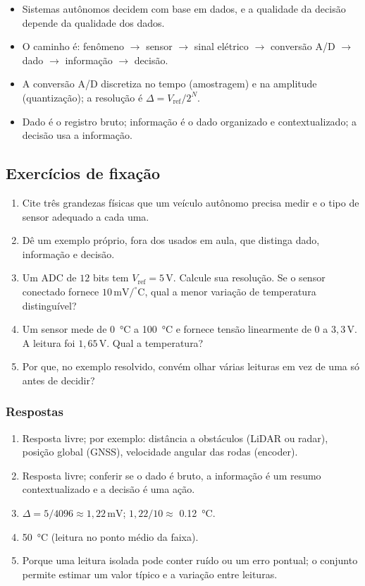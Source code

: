 \begin{itemize}
  \item Sistemas autônomos decidem com base em dados, e a qualidade da decisão depende da qualidade dos dados.
  \item O caminho é: fenômeno $\rightarrow$ sensor $\rightarrow$ sinal elétrico $\rightarrow$ conversão A/D $\rightarrow$ dado $\rightarrow$ informação $\rightarrow$ decisão.
  \item A conversão A/D discretiza no tempo (amostragem) e na amplitude (quantização); a resolução é $\Delta = V_{\mathrm{ref}}/2^{N}$.
  \item Dado é o registro bruto; informação é o dado organizado e contextualizado; a decisão usa a informação.
\end{itemize}
 
\subsection{Exercícios de fixação}
 
\begin{enumerate}
  \item Cite três grandezas físicas que um veículo autônomo precisa medir e o tipo de sensor adequado a cada uma.
  \item Dê um exemplo próprio, fora dos usados em aula, que distinga dado, informação e decisão.
  \item Um ADC de $12$ bits tem $V_{\mathrm{ref}} = 5\,\mathrm{V}$. Calcule sua resolução. Se o sensor conectado fornece $10\,\mathrm{mV}/^{\circ}\mathrm{C}$, qual a menor variação de temperatura distinguível?
	\item Um sensor mede de \qty{0}{\degreeCelsius} a \qty{100}{\degreeCelsius} e fornece tensão linearmente de $0$ a $3{,}3\,\mathrm{V}$. A leitura foi $1{,}65\,\mathrm{V}$. Qual a temperatura?
  \item Por que, no exemplo resolvido, convém olhar várias leituras em vez de uma só antes de decidir?
\end{enumerate}
 
\subsubsection*{Respostas}
 
\begin{enumerate}
  \item Resposta livre; por exemplo: distância a obstáculos (LiDAR ou radar), posição global (GNSS), velocidade angular das rodas (encoder).
  \item Resposta livre; conferir se o dado é bruto, a informação é um resumo contextualizado e a decisão é uma ação.
	\item $\Delta = 5/4096 \approx 1{,}22\,\mathrm{mV}$; $1{,}22/10 \approx$ \qty{0.12}{\degreeCelsius}.
	\item \qty{50}{\degreeCelsius} (leitura no ponto médio da faixa).
  \item Porque uma leitura isolada pode conter ruído ou um erro pontual; o conjunto permite estimar um valor típico e a variação entre leituras.
\end{enumerate}
 

